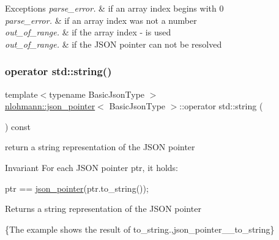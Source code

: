\begin{DoxyExceptions}{Exceptions}
{\em parse\+\_\+error.} & if an array index begins with \textquotesingle{}0\textquotesingle{} \\
\hline
{\em parse\+\_\+error.} & if an array index was not a number \\
\hline
{\em out\+\_\+of\+\_\+range.} & if the array index \textquotesingle{}-\/\textquotesingle{} is used \\
\hline
{\em out\+\_\+of\+\_\+range.} & if the J\+S\+ON pointer can not be resolved \\
\hline
\end{DoxyExceptions}
\mbox{\label{classnlohmann_1_1json__pointer_ae9015c658f99cf3d48a8563accc79988}} 
\subsubsection{\texorpdfstring{operator std\+::string()}{operator std::string()}}
{\footnotesize\ttfamily template$<$typename Basic\+Json\+Type $>$ \\
\hyperlink{classnlohmann_1_1json__pointer}{nlohmann\+::json\+\_\+pointer}$<$ Basic\+Json\+Type $>$\+::operator std\+::string (\begin{DoxyParamCaption}{ }\end{DoxyParamCaption}) const\hspace{0.3cm}{\ttfamily [inline]}}



return a string representation of the J\+S\+ON pointer 

\begin{DoxyInvariant}{Invariant}
For each J\+S\+ON pointer {\ttfamily ptr}, it holds\+: 
\begin{DoxyCode}
ptr == \hyperlink{classnlohmann_1_1json__pointer_a7f32d7c62841f0c4a6784cf741a6e4f8}{json\_pointer}(ptr.to\_string());
\end{DoxyCode}

\end{DoxyInvariant}
\begin{DoxyReturn}{Returns}
a string representation of the J\+S\+ON pointer
\end{DoxyReturn}
\{The example shows the result of {\ttfamily to\+\_\+string}.,json\+\_\+pointer\+\_\+\+\_\+to\+\_\+string\}

